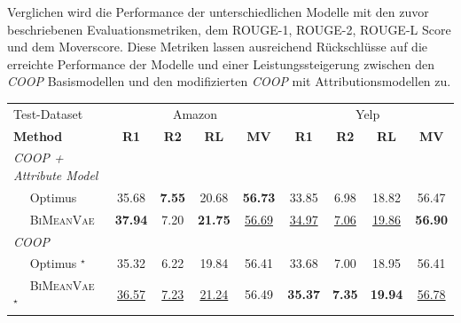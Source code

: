 Verglichen wird die Performance der unterschiedlichen Modelle mit den zuvor beschriebenen Evaluationsmetriken, dem ROUGE-1, ROUGE-2, ROUGE-L Score und dem Moverscore.
Diese Metriken lassen ausreichend Rückschlüsse auf die erreichte Performance der Modelle und einer Leistungssteigerung zwischen den \textit{COOP} Basismodellen und den modifizierten \textit{COOP} mit Attributionsmodellen zu.
\begin{table}[!h]
  
    \centering
    \begin{tabular}{@{}lcccc|cccc@{}}
    \toprule
             Test-Dataset                  & \multicolumn{4}{c}{Amazon} & \multicolumn{4}{c}{Yelp} \\ 
    \textbf{Method} & \textbf{R1} & \textbf{R2} & \textbf{RL} & \textbf{MV} & \textbf{R1} & \textbf{R2} & \textbf{RL} & \textbf{MV}\\ \midrule
    
    \rowcolor{gray!15} \textit{COOP + Attribute Model}        &         &         &        &        &        &   & &     \\
    \rowcolor{gray!15} $\quad$ Optimus            &   35.68   & \textbf{7.55}  &  20.68 & \textbf{56.73} &  33.85   &  6.98  & 18.82  &  56.47  \\ 
    \rowcolor{gray!15} $\quad$ \textsc{BiMeanVae}  &   \textbf{37.94}  &   7.20    &  \textbf{21.75} & \underline{56.69} &   \underline{34.97}  & \underline{7.06}     & \underline{19.86}  &  \textbf{56.90}  \\ \midrule

    \textit{COOP}              &         &         &        &        &        & &   &    \\ %
    $\quad$ Optimus   $^{\star}$          & 35.32 &6.22 &19.84  & 56.41&  33.68& 7.00 &18.95 & 56.41\\ 
    $\quad$ \textsc{BiMeanVae}  $^{\star}$   & \underline{36.57} &\underline{7.23} &\underline{21.24} & 56.49 & \textbf{35.37} & \textbf{7.35} &\textbf{19.94} & \underline{56.78} \\ \midrule
    


\end{tabular}
\end{table}

